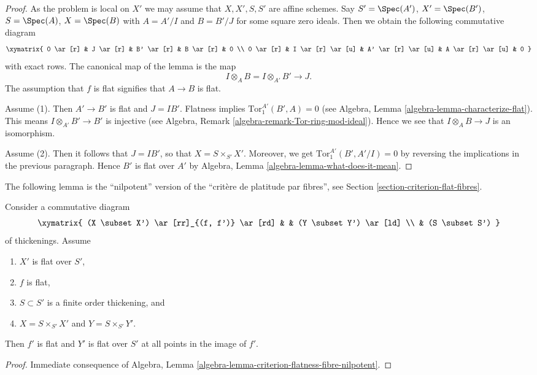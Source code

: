 \begin{proof}
As the problem is local on $X'$ we may assume that $X, X', S, S'$
are affine schemes. Say $S' = \Spec(A')$, $X' = \Spec(B')$,
$S = \Spec(A)$, $X = \Spec(B)$ with $A = A'/I$ and $B = B'/J$
for some square zero ideals. Then we obtain the following commutative
diagram
$$
\xymatrix{
0 \ar[r] &
J \ar[r] &
B' \ar[r] &
B \ar[r] & 0 \\
0 \ar[r] &
I \ar[r] \ar[u] &
A' \ar[r] \ar[u] &
A \ar[r] \ar[u] & 0
}
$$
with exact rows. The canonical map of the lemma is the map
$$
I \otimes_A B = I \otimes_{A'} B' \longrightarrow J.
$$
The assumption that $f$ is flat signifies that $A \to B$ is flat.

\medskip\noindent
Assume (1). Then $A' \to B'$ is flat and $J = IB'$. Flatness implies
$\text{Tor}_1^{A'}(B', A) = 0$ (see
Algebra, Lemma \ref{algebra-lemma-characterize-flat}).
This means $I \otimes_{A'} B' \to B'$ is injective (see
Algebra, Remark \ref{algebra-remark-Tor-ring-mod-ideal}).
Hence we see that $I \otimes_A B \to J$ is an isomorphism.

\medskip\noindent
Assume (2). Then it follows that $J = IB'$, so that $X = S \times_{S'} X'$.
Moreover, we get $\text{Tor}_1^{A'}(B', A'/I) = 0$ by reversing the
implications in the previous paragraph. Hence $B'$ is flat over $A'$ by
Algebra, Lemma \ref{algebra-lemma-what-does-it-mean}.
\end{proof}

\noindent
The following lemma is the ``nilpotent'' version of the
``crit\`ere de platitude par fibres'', see
Section \ref{section-criterion-flat-fibres}.

\begin{lemma}
\label{lemma-flatness-morphism-thickenings}
Consider a commutative diagram
$$
\xymatrix{
(X \subset X') \ar[rr]_{(f, f')} \ar[rd] & & (Y \subset Y') \ar[ld] \\
& (S \subset S')
}
$$
of thickenings. Assume
\begin{enumerate}
\item $X'$ is flat over $S'$,
\item $f$ is flat,
\item $S \subset S'$ is a finite order thickening, and
\item $X = S \times_{S'} X'$ and $Y = S \times_{S'} Y'$.
\end{enumerate}
Then $f'$ is flat and $Y'$ is flat over $S'$ at all points in
the image of $f'$.
\end{lemma}

\begin{proof}
Immediate consequence of
Algebra, Lemma \ref{algebra-lemma-criterion-flatness-fibre-nilpotent}.
\end{proof}

